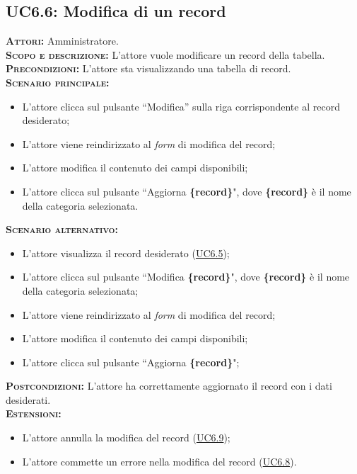 \subsection{UC6.6: Modifica di un record}
\label{sec:UC66}
\textsc{\textbf{Attori:}} Amministratore.\\
\textsc{\textbf{Scopo e descrizione:}} L'attore vuole modificare un record della tabella.\\
\textsc{\textsc{\textbf{Precondizioni:}}} L'attore sta visualizzando una tabella di record.\\
\textsc{\textbf{Scenario principale:}}
\begin{itemize}
    \item L'attore clicca sul pulsante ``Modifica'' sulla riga corrispondente al record desiderato;
    \item L'attore viene reindirizzato al \textit{form} di modifica del record;
    \item L'attore modifica il contenuto dei campi disponibili;
    \item L'attore clicca sul pulsante ``Aggiorna \textbf{\{record\}}", dove \textbf{\{record\}} è il nome della categoria selezionata.
\end{itemize}
\textsc{\textbf{Scenario alternativo:}}
\begin{itemize}
    \item L'attore visualizza il record desiderato (\hyperref[sec:UC65]{UC6.5});
    \item L'attore clicca sul pulsante ``Modifica \textbf{\{record\}}", dove \textbf{\{record\}} è il nome della categoria selezionata;
    \item L'attore viene reindirizzato al \textit{form} di modifica del record;
    \item L'attore modifica il contenuto dei campi disponibili;
    \item L'attore clicca sul pulsante ``Aggiorna \textbf{\{record\}}";
\end{itemize}
\textsc{\textbf{Postcondizioni:}} L'attore ha correttamente aggiornato il record con i dati desiderati.\\
\textsc{\textbf{Estensioni:}} \begin{itemize}
    \item L'attore annulla la modifica del record (\hyperref[sec:UC69]{UC6.9});
    \item L'attore commette un errore nella modifica del record (\hyperref[sec:UC68]{UC6.8}).
\end{itemize}


